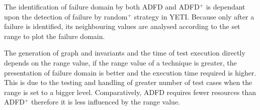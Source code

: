 \documentclass[runningheads,a4paper]{llncs}
\begin{document}
The identification of failure domain by both ADFD and ADFD$^+$ is dependant upon the detection of failure by random$^+$ strategy in YETI. Because only after a failure is identified, its neighbouring values are analysed according to the set range to plot the failure domain.

The generation of graph and invariants and the time of test execution directly depends on the range value, if the range value of a technique is greater, the presentation of failure domain is better and the execution time required is higher. This is due to the testing and handling of greater number of test cases when the range is set to a bigger level. Comparatively, ADFD requires fewer resources than ADFD$^+$ therefore it is less influenced by the range value.







\end{document}
